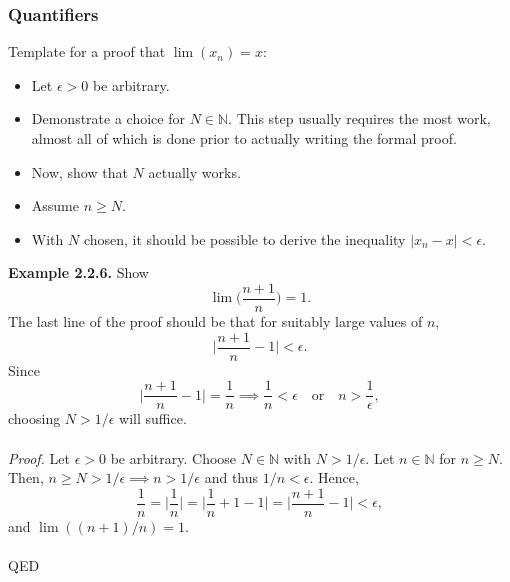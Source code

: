 \documentclass{article}
\begin{document}
            \subsubsection{Quantifiers}
                Template for a proof that $\lim(x_n) = x$:
                \begin{itemize}
                    \item Let $\epsilon>0$ be arbitrary.
                    \item Demonstrate a choice for $N\in \mathbb{N}$. This step usually requires the most work, almost all of which is done prior to actually writing the formal proof.
                    \item Now, show that $N$ actually works.
                    \item Assume $n\geq N$.
                    \item With $N$ chosen, it should be possible to derive the inequality $|x_n-x|<\epsilon$.
                \end{itemize}
                \textbf{Example 2.2.6.} Show
                \begin{equation*}
                    \lim \bigg(\frac{n+1}{n}\bigg)=1.
                \end{equation*}
                The last line of the proof should be that for suitably large values of $n$,
                \begin{equation*}
                    \bigg| \frac{n+1}{n}-1 \bigg| < \epsilon.
                \end{equation*}
                Since
                \begin{equation*}
                    \bigg| \frac{n+1}{n} - 1\bigg| = \frac{1}{n} \implies \frac{1}{n} < \epsilon \quad \text{or} \quad n > \frac{1}{\epsilon},
                \end{equation*}
                choosing $N > 1/ \epsilon$ will suffice.\\ \\
                \textit{Proof.} Let $\epsilon>0$ be arbitrary. Choose $N \in \mathbb{N}$ with $N>1/\epsilon$. Let $n\in \mathbb{N}$ for $n \geq N$. Then, $n \geq N > 1/\epsilon \implies n > 1/\epsilon$ and thus $1/n < \epsilon$. Hence,
                \begin{equation*}
                    \frac{1}{n}=\bigg|\frac{1}{n}\bigg|=\bigg|\frac{1}{n}+1-1\bigg|=\bigg|\frac{n+1}{n}-1\bigg| < \epsilon,
                \end{equation*}
                and $\lim((n+1)/n)=1$.\\ \\
                QED
            
\end{document}

